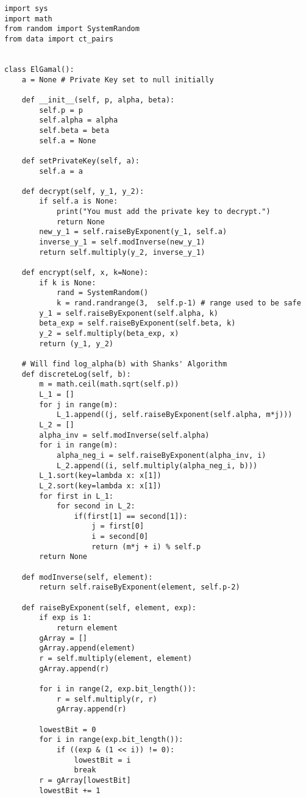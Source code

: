 \documentclass{article}
\begin{document}
\begin{lstlisting}
import sys
import math
from random import SystemRandom
from data import ct_pairs


class ElGamal():
    a = None # Private Key set to null initially

    def __init__(self, p, alpha, beta):
        self.p = p
        self.alpha = alpha
        self.beta = beta
        self.a = None

    def setPrivateKey(self, a):
        self.a = a
     
    def decrypt(self, y_1, y_2):
        if self.a is None:
            print("You must add the private key to decrypt.")
            return None
        new_y_1 = self.raiseByExponent(y_1, self.a)
        inverse_y_1 = self.modInverse(new_y_1)
        return self.multiply(y_2, inverse_y_1)   

    def encrypt(self, x, k=None):
        if k is None:
            rand = SystemRandom()
            k = rand.randrange(3,  self.p-1) # range used to be safe
        y_1 = self.raiseByExponent(self.alpha, k)
        beta_exp = self.raiseByExponent(self.beta, k)
        y_2 = self.multiply(beta_exp, x)
        return (y_1, y_2)

    # Will find log_alpha(b) with Shanks' Algorithm
    def discreteLog(self, b):
        m = math.ceil(math.sqrt(self.p))
        L_1 = []
        for j in range(m):
            L_1.append((j, self.raiseByExponent(self.alpha, m*j)))
        L_2 = []
        alpha_inv = self.modInverse(self.alpha)
        for i in range(m):
            alpha_neg_i = self.raiseByExponent(alpha_inv, i)
            L_2.append((i, self.multiply(alpha_neg_i, b)))
        L_1.sort(key=lambda x: x[1])
        L_2.sort(key=lambda x: x[1])
        for first in L_1:
            for second in L_2:
                if(first[1] == second[1]):
                    j = first[0]
                    i = second[0]
                    return (m*j + i) % self.p
        return None

    def modInverse(self, element):
        return self.raiseByExponent(element, self.p-2)

    def raiseByExponent(self, element, exp):
        if exp is 1:
            return element
        gArray = []
        gArray.append(element)
        r = self.multiply(element, element)
        gArray.append(r)

        for i in range(2, exp.bit_length()):
            r = self.multiply(r, r)
            gArray.append(r)

        lowestBit = 0
        for i in range(exp.bit_length()):
            if ((exp & (1 << i)) != 0):
                lowestBit = i
                break
        r = gArray[lowestBit]
        lowestBit += 1


\end{lstlisting}
\end{document}
